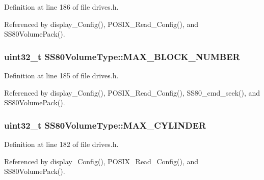 Definition at line 186 of file drives.\+h.



Referenced by display\+\_\+\+Config(), P\+O\+S\+I\+X\+\_\+\+Read\+\_\+\+Config(), and S\+S80\+Volume\+Pack().

\subsubsection[{\texorpdfstring{M\+A\+X\+\_\+\+B\+L\+O\+C\+K\+\_\+\+N\+U\+M\+B\+ER}{MAX_BLOCK_NUMBER}}]{\setlength{\rightskip}{0pt plus 5cm}uint32\+\_\+t S\+S80\+Volume\+Type\+::\+M\+A\+X\+\_\+\+B\+L\+O\+C\+K\+\_\+\+N\+U\+M\+B\+ER}\hypertarget{structSS80VolumeType_afe3db69c9ec54fa6d9fd48f3e6e9097b}{}\label{structSS80VolumeType_afe3db69c9ec54fa6d9fd48f3e6e9097b}


Definition at line 185 of file drives.\+h.



Referenced by display\+\_\+\+Config(), P\+O\+S\+I\+X\+\_\+\+Read\+\_\+\+Config(), S\+S80\+\_\+cmd\+\_\+seek(), and S\+S80\+Volume\+Pack().

\subsubsection[{\texorpdfstring{M\+A\+X\+\_\+\+C\+Y\+L\+I\+N\+D\+ER}{MAX_CYLINDER}}]{\setlength{\rightskip}{0pt plus 5cm}uint32\+\_\+t S\+S80\+Volume\+Type\+::\+M\+A\+X\+\_\+\+C\+Y\+L\+I\+N\+D\+ER}\hypertarget{structSS80VolumeType_a53b65739246cea4e0d9095c88b03be8e}{}\label{structSS80VolumeType_a53b65739246cea4e0d9095c88b03be8e}


Definition at line 182 of file drives.\+h.



Referenced by display\+\_\+\+Config(), P\+O\+S\+I\+X\+\_\+\+Read\+\_\+\+Config(), and S\+S80\+Volume\+Pack().


